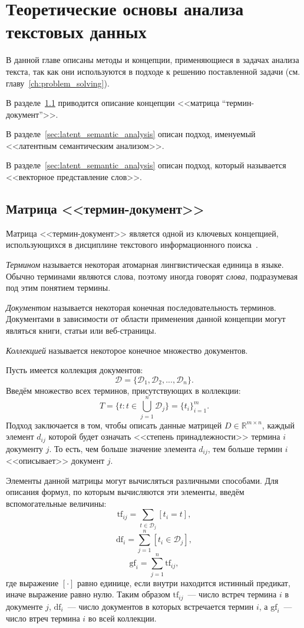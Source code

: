 \chapter{Теоретические основы анализа текстовых данных}

В данной главе описаны методы и концепции, применяющиеся в
задачах анализа текста, так как они используются в подходе
к решению поставленной задачи (см. главу~\ref{ch:problem_solving}).

В разделе~\ref{sec:term_document_matrix} приводится описание
концепции <<матрица “термин-документ”>>.

В разделе~\ref{sec:latent_semantic_analysis} описан подход,
именуемый <<латентным семантическим анализом>>.

В разделе~\ref{sec:latent_semantic_analysis} описан подход,
который называется <<векторное представление слов>>.

\section{Матрица <<термин-документ>>}
\label{sec:term_document_matrix}

Матрица <<термин-документ>> является одной из ключевых концепцией,
использующихся в дисциплине текстового информационного 
поиска~\cite{manning2008introduction}. 

\textit{Термином} называется некоторая атомарная лингвистическая
единица в языке. Обычно терминами являются слова, поэтому иногда
говорят \textit{слова}, подразумевая под этим понятием термины.

\textit{Документом} называется некоторая конечная последовательность
терминов. Документами в зависимости от области применения данной концепции
могут являться книги, статьи или веб-страницы.

\textit{Коллекцией} называется некоторое конечное множество документов.

Пусть имеется коллекция документов:
\[
    \mathcal{D} = \{\mathcal{D}_1, \mathcal{D}_2,...,\mathcal{D}_n\}.
\]
Введём множество всех терминов, присутствующих в коллекции:
\[
    T = \{t \colon t \in \bigcup_{j=1}^{n} \mathcal{D}_j\} = \{t_i\}_{i=1}^{m}.
\]
Подход заключается в том, чтобы описать данные матрицей 
$D \in \mathbb{R}^{m \times n}$, каждый элемент $d_{ij}$ которой будет
означать <<степень принадлежности>> термина $i$ документу $j$. То есть,
чем больше значение элемента $d_{ij}$, тем больше термин $i$ <<описывает>>
документ $j$.

Элементы данной матрицы могут вычисляться различными способами. Для описания
формул, по которым вычисляются эти элементы, введём вспомогательные величины:
\[
    \mathrm{tf}_{ij} = \sum_{t \in \mathcal{D}_j} [t_i = t],
\]
\[
    \mathrm{df}_{i} = \sum_{j=1}^{n} [t_i \in \mathcal{D}_j],
\]
\[
    \mathrm{gf}_{i} = \sum_{j=1}^{n} \mathrm{tf}_{ij},
\]
где выражение $[\cdot]$ равно единице, если внутри находится истинный
предикат, иначе выражение равно нулю. Таким образом $\mathrm{tf}_{ij}$~---
число встреч термина $i$ в документе $j$, $\mathrm{df}_{i}$~---
число документов в которых встречается термин $i$, а $\mathrm{gf}_{i}$~---
число втреч термина $i$ во всей коллекции.

